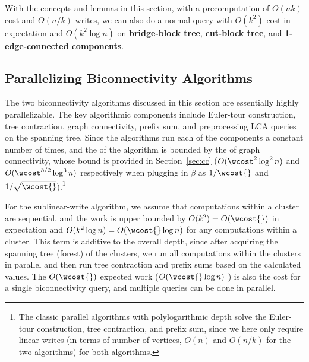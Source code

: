 \bigskip
With the concepts and lemmas in this section, with a precomputation of $O(nk)$ cost and $O(n/k)$ writes, we can also do a normal query with $O(k^2)$ cost in expectation and $O(k^2\log n)$ \whp{} on \textbf{bridge-block tree}, \textbf{cut-block tree}, and \textbf{1-edge-connected components}.

\subsection{Parallelizing Biconnectivity Algorithms}\label{sec:biconn-depth}

The two biconnectivity algorithms discussed in this section are essentially highly parallelizable.
The key algorithmic components include Euler-tour construction, tree contraction, graph connectivity, prefix sum, and preprocessing LCA queries on the spanning tree.
Since the algorithms run each of the components a constant number of times, and the \depth{} of the algorithm is bounded by the \depth{} of graph connectivity, whose bound is provided in Section~\ref{sec:cc} ($O(\wcost^2\log^2 n)$ and $O(\wcost^{3/2}\log^3 n)$ \whp{} respectively when plugging in $\beta$ as $1/\wcost{}$ and $1/\sqrt\wcost{}$).\footnote{The classic parallel algorithms with polylogarithmic depth solve the Euler-tour construction, tree contraction, and prefix sum, since we here only require linear writes (in terms of number of vertices, $O(n)$ and $O(n/k)$ for the two algorithms) for both algorithms.}

For the sublinear-write algorithm, we assume that computations
within a cluster are sequential,
and the work is upper bounded by $O(k^2)=O(\wcost{})$ in expectation and $O(k^2\log n)=O(\wcost{}\log n)$ \whp{} for any computations within a cluster.
This term is additive to the overall depth, since after acquiring the spanning tree (forest) of the clusters, we run all computations within the clusters in parallel and then run tree contraction and prefix sums based on the calculated values.
The $O(\wcost{})$ expected work ($O(\wcost{}\log n)$ \whp{}) is also the cost for a single biconnectivity query, and multiple queries can be done in parallel.


